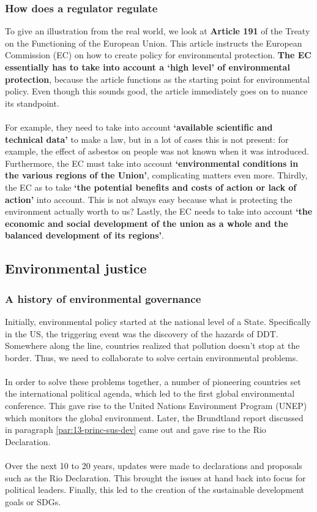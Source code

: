 \documentclass[../summary.tex]{subfiles}
\begin{document}
		\subsubsection{How does a regulator regulate}
			To give an illustration from the real world, we look at \textbf{Article 191} of the Treaty on the Functioning of the European Union. This article instructs the European Commission (EC) on how to create policy for environmental protection. \textbf{The EC essentially has to take into account a `high level' of environmental protection}, because the article functions as the starting point for environmental policy. Even though this sounds good, the article immediately goes on to nuance its standpoint.\\
			\\
			 For example, they need to take into account \textbf{`available scientific and technical data'} to make a law, but in a lot of cases this is not present: for example, the effect of asbestos on people was not known when it was introduced.  Furthermore, the EC must take into account \textbf{`environmental conditions in the various regions of the Union'}, complicating matters even more. Thirdly, the EC as to take \textbf{`the potential benefits and costs of action or lack of action'} into account. This is not always easy because what is protecting the environment actually worth to us? Lastly, the EC needs to take into account \textbf{`the economic and social development of the union as a whole and the balanced development of its regions'}.
	
	\subsection{Environmental justice}
		\subsubsection{A history of environmental governance}
			Initially, environmental policy started at the national level of a State. Specifically in the US, the triggering event was the discovery of the hazards of DDT. Somewhere along the line, countries realized that pollution doesn't stop at the border. Thus, we need to collaborate to solve certain environmental problems. \\
			\\
			In order to solve these problems together, a number of pioneering countries set the international political agenda, which led to the first global environmental conference. This gave rise to the United Nations Environment Program (UNEP) which monitors the global environment. Later, the Brundtland report discussed in paragraph \ref{par:13-princ-sus-dev} came out and gave rise to the Rio Declaration. \\
			\\
			Over the next 10 to 20 years, updates were made to declarations and proposals such as the Rio Declaration. This brought the issues at hand back into focus for political leaders. Finally, this led to the creation of the sustainable development goals or SDGs. 
		
\end{document}
